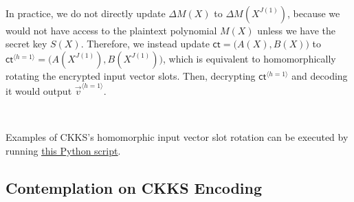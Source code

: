 $ $

In practice, we do not directly update $\Delta M(X)$ to $\Delta M(X^{J(1)})$, because we would not have access to the plaintext polynomial $M(X)$ unless we have the secret key $S(X)$. Therefore, we instead update $\textsf{ct}=\bm(A(X), B(X)\bm)$ to $\textsf{ct}^{\langle h=1 \rangle}=\bm(A(X^{J(1)}), B(X^{J(1)})\bm)$, which is equivalent to homomorphically rotating the encrypted input vector slots. Then, decrypting $\textsf{ct}^{\langle h=1 \rangle}$ and decoding it would output $\vec{v}^{\langle h=1 \rangle}$.

$ $


 Examples of CKKS's homomorphic input vector slot rotation can be executed by running \href{https://github.com/gogo9th/fhe-textbook/blob/main/soruce%20code/ckks.py}{\underline{this Python script}}. 





\subsection{Contemplation on CKKS Encoding}
\label{subsec:ckks-encoding-contemplate}

